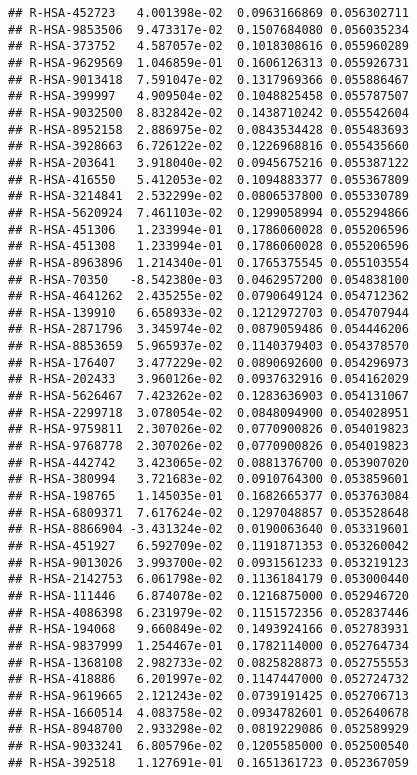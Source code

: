 \documentclass[
]{article}
\begin{document}
\begin{verbatim}
## R-HSA-452723   4.001398e-02  0.0963166869 0.056302711
## R-HSA-9853506  9.473317e-02  0.1507684080 0.056035234
## R-HSA-373752   4.587057e-02  0.1018308616 0.055960289
## R-HSA-9629569  1.046859e-01  0.1606126313 0.055926731
## R-HSA-9013418  7.591047e-02  0.1317969366 0.055886467
## R-HSA-399997   4.909504e-02  0.1048825458 0.055787507
## R-HSA-9032500  8.832842e-02  0.1438710242 0.055542604
## R-HSA-8952158  2.886975e-02  0.0843534428 0.055483693
## R-HSA-3928663  6.726122e-02  0.1226968816 0.055435660
## R-HSA-203641   3.918040e-02  0.0945675216 0.055387122
## R-HSA-416550   5.412053e-02  0.1094883377 0.055367809
## R-HSA-3214841  2.532299e-02  0.0806537800 0.055330789
## R-HSA-5620924  7.461103e-02  0.1299058994 0.055294866
## R-HSA-451306   1.233994e-01  0.1786060028 0.055206596
## R-HSA-451308   1.233994e-01  0.1786060028 0.055206596
## R-HSA-8963896  1.214340e-01  0.1765375545 0.055103554
## R-HSA-70350   -8.542380e-03  0.0462957200 0.054838100
## R-HSA-4641262  2.435255e-02  0.0790649124 0.054712362
## R-HSA-139910   6.658933e-02  0.1212972703 0.054707944
## R-HSA-2871796  3.345974e-02  0.0879059486 0.054446206
## R-HSA-8853659  5.965937e-02  0.1140379403 0.054378570
## R-HSA-176407   3.477229e-02  0.0890692600 0.054296973
## R-HSA-202433   3.960126e-02  0.0937632916 0.054162029
## R-HSA-5626467  7.423262e-02  0.1283636903 0.054131067
## R-HSA-2299718  3.078054e-02  0.0848094900 0.054028951
## R-HSA-9759811  2.307026e-02  0.0770900826 0.054019823
## R-HSA-9768778  2.307026e-02  0.0770900826 0.054019823
## R-HSA-442742   3.423065e-02  0.0881376700 0.053907020
## R-HSA-380994   3.721683e-02  0.0910764300 0.053859601
## R-HSA-198765   1.145035e-01  0.1682665377 0.053763084
## R-HSA-6809371  7.617624e-02  0.1297048857 0.053528648
## R-HSA-8866904 -3.431324e-02  0.0190063640 0.053319601
## R-HSA-451927   6.592709e-02  0.1191871353 0.053260042
## R-HSA-9013026  3.993700e-02  0.0931561233 0.053219123
## R-HSA-2142753  6.061798e-02  0.1136184179 0.053000440
## R-HSA-111446   6.874078e-02  0.1216875000 0.052946720
## R-HSA-4086398  6.231979e-02  0.1151572356 0.052837446
## R-HSA-194068   9.660849e-02  0.1493924166 0.052783931
## R-HSA-9837999  1.254467e-01  0.1782114000 0.052764734
## R-HSA-1368108  2.982733e-02  0.0825828873 0.052755553
## R-HSA-418886   6.201997e-02  0.1147447000 0.052724732
## R-HSA-9619665  2.121243e-02  0.0739191425 0.052706713
## R-HSA-1660514  4.083758e-02  0.0934782601 0.052640678
## R-HSA-8948700  2.933298e-02  0.0819229086 0.052589929
## R-HSA-9033241  6.805796e-02  0.1205585000 0.052500540
## R-HSA-392518   1.127691e-01  0.1651361723 0.052367059

\end{verbatim}
\end{document}
